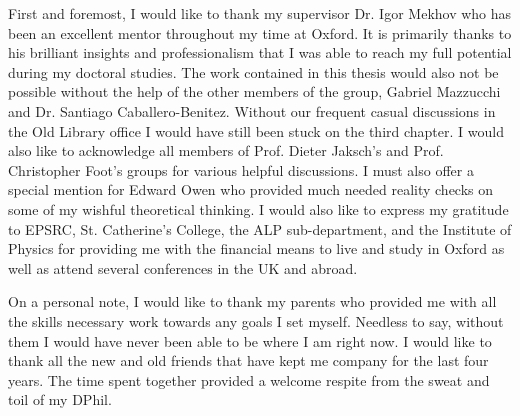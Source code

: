 
\begin{acknowledgements}      

First and foremost, I would like to thank my supervisor Dr. Igor
Mekhov who has been an excellent mentor throughout my time at
Oxford. It is primarily thanks to his brilliant insights and
professionalism that I was able to reach my full potential during my
doctoral studies. The work contained in this thesis would also not be
possible without the help of the other members of the group, Gabriel
Mazzucchi and Dr. Santiago Caballero-Benitez. Without our frequent
casual discussions in the Old Library office I would have still been
stuck on the third chapter. I would also like to acknowledge all
members of Prof. Dieter Jaksch's and Prof. Christopher Foot's groups
for various helpful discussions. I must also offer a special mention
for Edward Owen who provided much needed reality checks on some of my
wishful theoretical thinking. I would also like to express my
gratitude to EPSRC, St. Catherine's College, the ALP sub-department,
and the Institute of Physics for providing me with the financial means
to live and study in Oxford as well as attend several conferences in
the UK and abroad.

On a personal note, I would like to thank my parents who provided me
with all the skills necessary work towards any goals I set
myself. Needless to say, without them I would have never been able to
be where I am right now. I would like to thank all the new and old
friends that have kept me company for the last four years. The time
spent together provided a welcome respite from the sweat and toil of
my DPhil.

\vspace{2em}

\end{acknowledgements}
